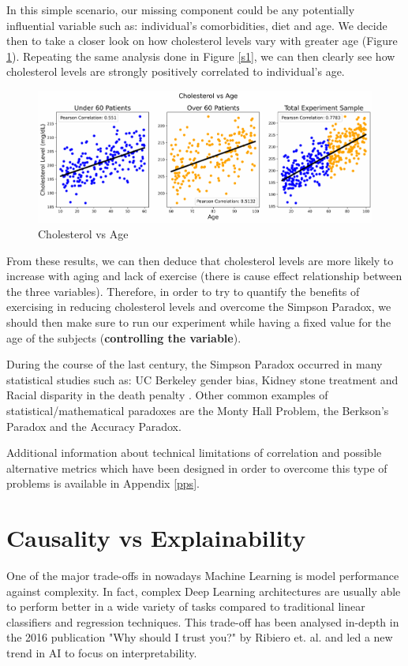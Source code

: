 In this simple scenario, our missing component could be any potentially influential variable such as: individual's comorbidities, diet and age. We decide then to take a closer look on how cholesterol levels vary with greater age (Figure \ref{s2}). Repeating the same analysis done in Figure \ref{s1}, we can then clearly see how cholesterol levels are strongly positively correlated to individual's age.

\begin{figure}[ht!]%
    \centering
    \includegraphics[width=1\linewidth]{latex/images/simpson2.pdf}
    \vspace{-0.2cm}
    \caption{Cholesterol vs Age}
    \label{s2}
\end{figure}

From these results, we can then deduce that cholesterol levels are more likely to increase with aging and lack of exercise (there is cause effect relationship between the three variables). Therefore, in order to try to quantify the benefits of exercising in reducing cholesterol levels and overcome the Simpson Paradox, we should then make sure to run our experiment while having a fixed value for the age of the subjects (\textbf{controlling the variable}).   

During the course of the last century, the Simpson Paradox occurred in many statistical studies such as: UC Berkeley gender bias, Kidney stone treatment and Racial disparity in the death penalty \cite{simpara}. Other common examples of statistical/mathematical paradoxes are the Monty Hall Problem, the Berkson's Paradox and the Accuracy Paradox.

Additional information about technical limitations of correlation and possible alternative metrics which have been designed in order to overcome this type of problems is available in Appendix \ref{pps}.

\section{Causality vs Explainability}
One of the major trade-offs in nowadays Machine Learning is model performance against complexity. In fact, complex Deep Learning architectures are usually able to perform better in a wide variety of tasks compared to traditional linear classifiers and regression techniques. This trade-off has been analysed in-depth in the 2016 publication "Why should I trust you?" by Ribiero et. al. \cite{otto} and led a new trend in AI to focus on interpretability.

